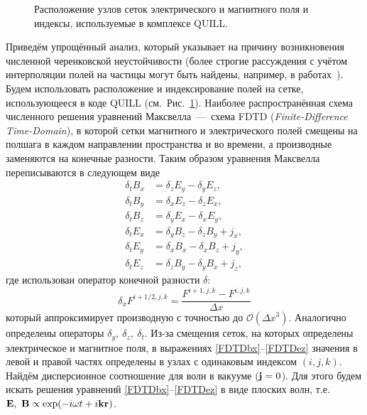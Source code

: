\begin{figure}[ht]
    \caption{Расположение узлов сеток электрического и магнитного поля и индексы, используемые в комплексе QUILL.}
    \label{fig:ch3/sec4/Quill_indecies}
\end{figure}
Приведём упрощённый анализ, который указывает на причину возникновения численной черенковской неустойчивости (более строгие рассуждения с учётом интерполяции полей на частицы могут быть найдены, например, в работах~\cite{xu2013numerical, godfrey2013numerical}).
Будем использовать расположение и индексирование полей на сетке, использующееся в коде QUILL (см.~Рис.~\ref{fig:ch3/sec4/Quill_indecies}).
Наиболее распространённая схема численного решения уравнений Максвелла~---~схема FDTD (\textit{Finite-Difference Time-Domain}), в которой сетки магнитного и электрического полей смещены на полшага в каждом направлении пространства и во времени, а производные заменяются на конечные разности.
Таким образом уравнения Максвелла переписываются в следующем виде
\begin{align}
    \label{FDTDbx}
    \delta_t B_x &= \delta_z E_y - \delta_y E_z, \\
    \label{FDTDby}
    \delta_t B_y &= \delta_x E_z - \delta_z E_x, \\
    \label{FDTDbz}
    \delta_t B_z &= \delta_y E_x - \delta_x E_y, \\
    \label{FDTDex}
    \delta_t E_x &= \delta_y B_z - \delta_z B_y + j_x, \\
    \label{FDTDey}
    \delta_t E_y &= \delta_x B_x - \delta_x B_z + j_y, \\
    \label{FDTDez}
    \delta_t E_z &= \delta_z B_y - \delta_y B_x + j_z,
\end{align}
где использован оператор конечной разности $\delta$:
\begin{equation}
    \delta_x F^{i+1/2,j,k}=\frac{F^{i+1,j,k}-F^{i,j,k}}{\Delta x}
\end{equation}
который аппроксимирует производную с точностью до $\mathcal{O}({\Delta x}^3)$.
Аналогично определены операторы $\delta_y,\ \delta_z,\ \delta_t$.
Из-за смещения сеток, на которых определены электрическое и магнитное поля, в выражениях \eqref{FDTDbx}--\eqref{FDTDez} значения в левой и правой частях определены в узлах с одинаковым индексом $(i,j,k)$.
Найдём дисперсионное соотношение для волн в вакууме ($\vb{j}=0$).
Для этого будем искать решения уравнений \eqref{FDTDbx}--\eqref{FDTDez} в виде плоских волн, т.е. $\vb{E},\ \vb{B} \propto \exp(-i\omega t + i \vb{kr})$.
